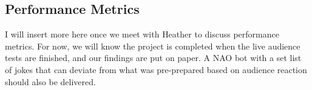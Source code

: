 \documentclass[onecolumn, draftclsnofoot,10pt, compsoc]{IEEEtran}
\begin{document}
\subsection{Performance Metrics}

I will insert more here once we meet with Heather to discuss performance metrics.
For now, we will know the project is completed when the live audience tests are finished, and our findings are put on paper.
A NAO bot with a set list of jokes that can deviate from what was pre-prepared based on audience reaction should also be delivered.


\end{document}
